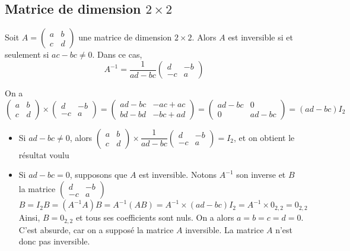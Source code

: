 \documentclass[11pt,fleqn]{book} %
\begin{document}
\newpage

\subsection{Matrice de dimension $2 \times 2$}

\begin{proposition}Soit $A = \begin{pmatrix}
a & b \\ c & d
\end{pmatrix}$ une matrice de dimension $2 \times 2$. Alors $A$ est inversible si et seulement si $ac-bc \neq 0$. Dans ce cas,
\[A^{-1}=\dfrac{1}{ad-bc}\begin{pmatrix}
d & -b \\ -c & a
\end{pmatrix}\]\end{proposition}

\begin{demonstration}
On a
\[\begin{pmatrix}
a & b \\ c & d
\end{pmatrix} \times \begin{pmatrix}
d & -b \\ -c & a
\end{pmatrix} = \begin{pmatrix}
ad-bc & -ac+ac \\ bd-bd & -bc+ad
\end{pmatrix} = \begin{pmatrix}ad-bc & 0 \\ 0 & ad-bc\end{pmatrix} = (ad-bc)I_2\]

\begin{itemize}
\item Si $ad-bc \neq 0$, alors $\begin{pmatrix}
a & b \\ c & d
\end{pmatrix} \times \dfrac{1}{ad-bc}\begin{pmatrix}
d & -b \\ -c & a
\end{pmatrix}=I_2$, et on obtient le résultat voulu
\item Si $ad-bc=0$, supposons que $A$ est inversible. Notons $A^{-1}$ son inverse et $B$ la matrice  $\begin{pmatrix}
d & -b \\ -c & a
\end{pmatrix}$
\[B = I_2B = (A^{-1}A)B = A^{-1}(AB)=A^{-1} \times (ad-bc)I_2 = A^{-1} \times 0_{2,2}=0_{2,2}\]
Ainsi, $B=0_{2,2}$ et tous ses coefficients sont nuls. On a alors $a=b=c=d=0$. C'est absurde, car on a supposé la matrice $A$ inversible. La matrice $A$ n'est donc pas inversible.
\end{itemize}\end{demonstration}
\end{document}
